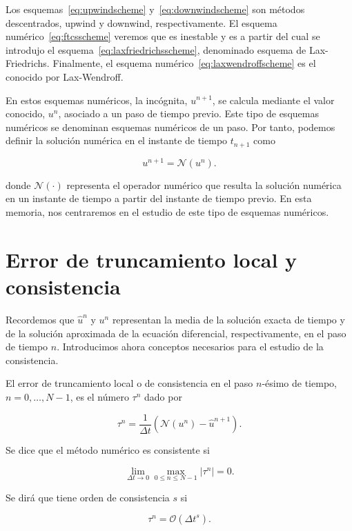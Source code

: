 Los esquemas~\eqref{eq:upwindscheme} y~\eqref{eq:downwindscheme} son
métodos descentrados, upwind y downwind, respectivamente.
El esquema numérico~\eqref{eq:ftcsscheme} veremos que es inestable y
es a partir del cual se introdujo el
esquema~\eqref{eq:laxfriedrichsscheme}, denominado esquema de
Lax-Friedrichs.
Finalmente, el esquema numérico~\eqref{eq:laxwendroffscheme} es el
conocido por Lax-Wendroff.

En estos esquemas numéricos, la incógnita, $u^{n+1}$, se calcula
mediante el valor conocido, $u^{n}$, asociado a un paso de tiempo
previo.
Este tipo de esquemas numéricos se denominan esquemas numéricos de un
paso.
Por tanto, podemos definir la solución numérica en el instante de
tiempo $t_{n+1}$ como

\begin{equation*}
  u^{n+1}=
  \mathcal{N}
  \left(u^{n}\right).
\end{equation*}

donde $\mathcal{N}\left(\cdot\right)$ representa el operador numérico
que resulta la solución numérica en un instante de tiempo a partir
del instante de tiempo previo.
En esta memoria, nos centraremos en el estudio de este tipo de
esquemas numéricos.

\section{Error de truncamiento local y consistencia}

Recordemos que $\widehat{u}^{n}$ y $u^{n}$ representan la media de la
solución exacta de tiempo y de la solución aproximada de la ecuación
diferencial, respectivamente, en el paso de tiempo $n$.
Introducimos ahora conceptos necesarios para el estudio de la
consistencia.

\begin{definition}
  El error de truncamiento local o de consistencia en el paso
  $n$-ésimo de tiempo, $n=0,\dotsc,N-1$, es el número $\tau^{n}$ dado
  por

  \begin{equation*}
    \tau^{n}=
    \frac{1}{\Delta t}
    \left(
    \mathcal{N}\left(u^{n}\right)-
    \widehat{u}^{n+1}
    \right).
  \end{equation*}
\end{definition}

\begin{definition}
  Se dice que el método numérico es consistente si

  \begin{equation*}
    \lim_{\Delta t\to0}
    \max_{0\leq n\leq N-1}
    \left|\tau^{n}\right|
    =0.
  \end{equation*}

  Se dirá que tiene orden de consistencia $s$ si

  \begin{equation*}
    \tau^{n}=
    \mathcal{O}
    \left({\Delta t}^{s}\right).
  \end{equation*}
\end{definition}


